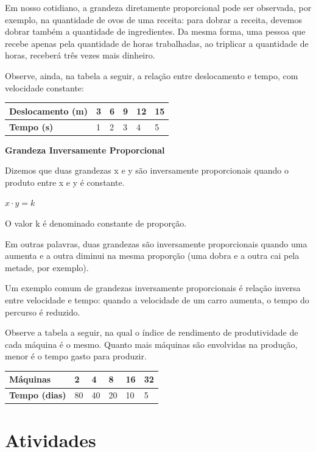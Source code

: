 \begin{escolha}
\begin{escolha}
{Em nosso cotidiano, a grandeza diretamente proporcional pode ser observada, 
por exemplo, na quantidade de ovos de uma receita: para dobrar a receita,
devemos dobrar também a quantidade de ingredientes. Da mesma forma, uma 
pessoa que recebe apenas pela quantidade de horas trabalhadas, ao triplicar
a quantidade de horas, receberá três vezes mais dinheiro.

Observe, ainda, na tabela a seguir, a relação entre deslocamento e tempo,
com velocidade constante:

\begin{center}
\begin{tabular}{|l|l|l|l|l|l|}
\hline
\textbf{Deslocamento (m)} & 3 & 6 & 9 & 12 & 15 \\ \hline
\textbf{Tempo (s)} & 1 & 2 & 3 & 4 & 5 \\ \hline
\end{tabular}
\end{center}

\textbf{Grandeza Inversamente Proporcional}

Dizemos que duas grandezas x e y são inversamente proporcionais quando o
produto entre x e y é constante.

$x \cdot y = k$

O valor k é denominado constante de proporção.

Em outras palavras, duas grandezas são inversamente proporcionais quando
uma aumenta e a outra diminui na mesma proporção (uma dobra e a outra
cai pela metade, por exemplo).

Um exemplo comum de grandezas inversamente proporcionais é relação
inversa entre velocidade e tempo: quando a velocidade de um carro aumenta, 
o tempo do percurso é reduzido.

Observe a tabela a seguir, na qual o índice de rendimento de produtividade
de cada máquina é o mesmo. Quanto mais máquinas são envolvidas na produção,
menor é o tempo gasto para produzir. 

\begin{center}
\begin{tabular}{|l|l|l|l|l|l|}
\hline
\textbf{Máquinas} & 2 & 4 & 8 & 16 & 32 \\ \hline
\textbf{Tempo (dias)} & 80 & 40 & 20 & 10 & 5 \\ \hline
\end{tabular}
\end{center}
}

\section{Atividades}


\end{escolha}
\end{escolha}
